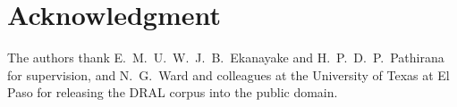\documentclass[journal]{IEEEtran}
\begin{document}
\section*{Acknowledgment}
The authors thank E.~M.~U.~W.~J.~B.~Ekanayake and H.~P.~D.~P.~Pathirana for supervision, and
N.~G.~Ward and colleagues at the University of Texas at El Paso for releasing the DRAL corpus into
the public domain.



\end{document}
